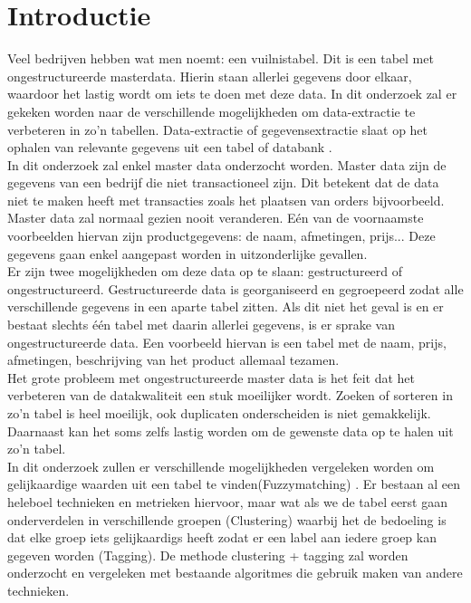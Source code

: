 
\section{Introductie}%
\label{sec:introductie}
Veel bedrijven hebben wat men noemt: een vuilnistabel. Dit is een tabel met ongestructureerde masterdata. Hierin staan allerlei gegevens door elkaar, waardoor het lastig wordt om iets te doen met deze data. In dit onderzoek zal er gekeken worden naar de verschillende mogelijkheden om data-extractie te verbeteren in zo'n tabellen. Data-extractie of gegevensextractie slaat op het ophalen van relevante gegevens uit een tabel of databank \autocite{Encyclo.nl}.
\\\indent
In dit onderzoek zal enkel master data onderzocht worden. Master data zijn de gegevens van een bedrijf die niet transactioneel zijn. Dit betekent dat de data niet te maken heeft met transacties zoals het plaatsen van orders bijvoorbeeld. Master data zal normaal gezien nooit veranderen. Eén van de voornaamste voorbeelden hiervan zijn productgegevens: de naam, afmetingen, prijs... Deze gegevens gaan enkel aangepast worden in uitzonderlijke gevallen. \autocite{Yellowground}
\\\indent
Er zijn twee mogelijkheden om deze data op te slaan: gestructureerd of ongestructureerd. Gestructureerde data is georganiseerd en gegroepeerd zodat alle verschillende gegevens in een aparte tabel zitten. Als dit niet het geval is en er bestaat slechts één tabel met daarin allerlei gegevens, is er sprake van ongestructureerde data. Een voorbeeld hiervan is een tabel met de naam, prijs, afmetingen, beschrijving van het product allemaal tezamen. \autocite{Seagate}
\\\indent
Het grote probleem met ongestructureerde master data is het feit dat het verbeteren van de datakwaliteit een stuk moeilijker wordt. Zoeken of sorteren in zo'n tabel is heel moeilijk, ook duplicaten onderscheiden is niet gemakkelijk. Daarnaast kan het soms zelfs lastig worden om de gewenste data op te halen uit zo'n tabel.
\\\indent
In dit onderzoek zullen er verschillende mogelijkheden vergeleken worden om gelijkaardige waarden uit een tabel te vinden(Fuzzymatching) \autocite{Silva2022}. Er bestaan al een heleboel technieken en metrieken hiervoor, maar wat als we de tabel eerst gaan onderverdelen in verschillende groepen (Clustering) waarbij het de bedoeling is dat elke groep iets gelijkaardigs heeft zodat er een label aan iedere groep kan gegeven worden (Tagging). De methode clustering + tagging zal worden onderzocht en vergeleken met bestaande algoritmes die gebruik maken van andere technieken.
